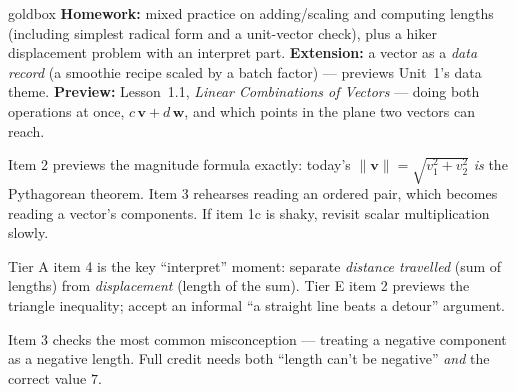 \documentclass[10pt]{article}
\newcommand{\vv}{\mathbf{v}}
\newcommand{\ww}{\mathbf{w}}
\begin{document}
\begin{skillbox}{goldbox}
\textbf{Homework:} mixed practice on adding/scaling and computing lengths (including simplest
radical form and a unit-vector check), plus a hiker displacement problem with an interpret
part. \textbf{Extension:} a vector as a \emph{data record} (a smoothie recipe scaled by a
batch factor) --- previews Unit~1's data theme. \textbf{Preview:} Lesson~1.1, \emph{Linear
Combinations of Vectors} --- doing both operations at once, $c\,\vv+d\,\ww$, and which points
in the plane two vectors can reach.
\end{skillbox}

\begin{teachernote}[Warm-Up]
Item 2 previews the magnitude formula exactly: today's $\|\mathbf{v}\|=\sqrt{v_1^2+v_2^2}$
\emph{is} the Pythagorean theorem. Item 3 rehearses reading an ordered pair, which becomes
reading a vector's components. If item 1c is shaky, revisit scalar multiplication slowly.
\end{teachernote}

\begin{teachernote}
Tier A item 4 is the key ``interpret'' moment: separate \emph{distance travelled} (sum of
lengths) from \emph{displacement} (length of the sum). Tier E item 2 previews the triangle
inequality; accept an informal ``a straight line beats a detour'' argument.
\end{teachernote}

\begin{teachernote}
Item 3 checks the most common misconception --- treating a negative component as a negative
length. Full credit needs both ``length can't be negative'' \emph{and} the correct value $7$.
\end{teachernote}
\end{document}
